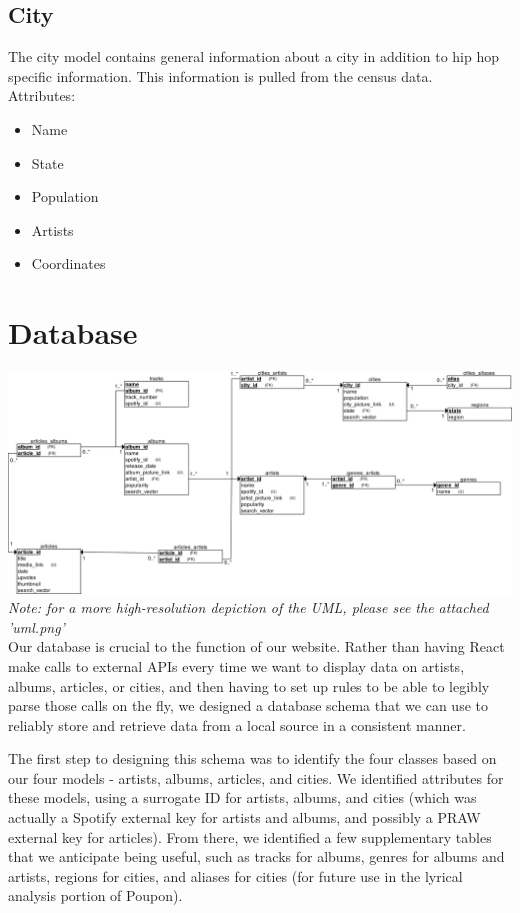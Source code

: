 \documentclass{scrartcl}
\begin{document}
    \subsection{City}
    The city model contains general information about a city in addition to hip hop specific information. This information is pulled from the census data.\\

    Attributes:
    \begin{itemize}
        \item Name
        \item State
        \item Population
        \item Artists
        \item Coordinates
    \end{itemize}

    \section{Database}
    \includegraphics[width=1\textwidth]{uml}
    \textit{Note: for a more high-resolution depiction of the UML, please see the attached 'uml.png'}\\

    Our database is crucial to the function of our website. Rather than having React make calls to external APIs every time we want to display data on artists, albums, articles, or cities, and then having to set up rules to be able to legibly parse those calls on the fly, we designed a database schema that we can use to reliably store and retrieve data from a local source in a consistent manner.

    The first step to designing this schema was to identify the four classes based on our four models - artists, albums, articles, and cities. We identified attributes for these models, using a surrogate ID for artists, albums, and cities (which was actually a Spotify external key for artists and albums, and possibly a PRAW external key for articles). From there, we identified a few supplementary tables that we anticipate being useful, such as tracks for albums, genres for albums and artists, regions for cities, and aliases for cities (for future use in the lyrical analysis portion of Poupon).
\end{document}
